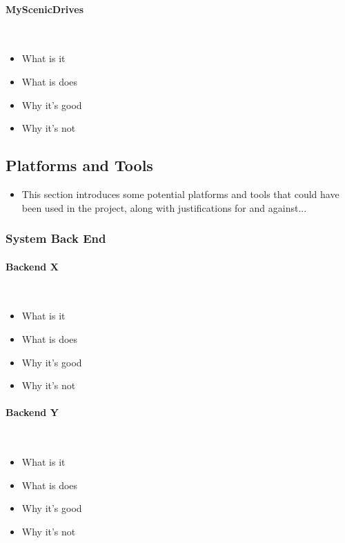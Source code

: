 \paragraph{MyScenicDrives}\ \\
{\color{red}
	\begin{itemize}
		\item What is it
		\item What is does
		\item Why it's good
		\item Why it's not
	\end{itemize}
}


\subsection{Platforms and Tools}
\label{sec:pat}

{\color{red}
	\begin{itemize}
		\item This section introduces some potential platforms and tools that could have been used in the project, along with justifications for and against...
	\end{itemize}
}

\subsubsection{System Back End}
\paragraph{Backend X}\ \\
{\color{red}
	\begin{itemize}
		\item What is it
		\item What is does
		\item Why it's good
		\item Why it's not
	\end{itemize}
}
\paragraph{Backend Y}\ \\
{\color{red}
	\begin{itemize}
		\item What is it
		\item What is does
		\item Why it's good
		\item Why it's not
	\end{itemize}
}
